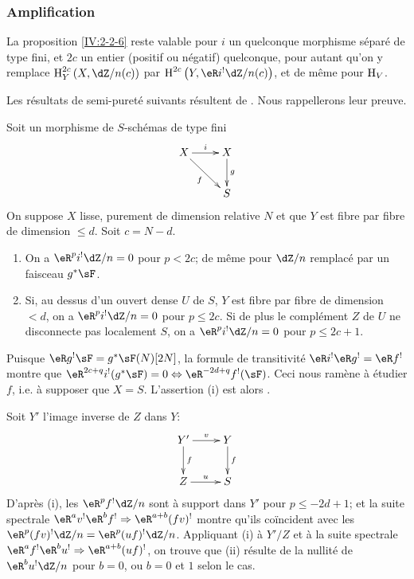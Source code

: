 \subsubsection{Amplification}\label{IV:2-2-7}

La proposition \ref{IV:2-2-6} reste valable pour $i$ un quelconque morphisme 
séparé de type fini, et $2 c$ un entier (positif ou négatif) quelconque, 
pour autant qu'on y remplace $\h_Y^{2 c}\left(X,\dZ/n(c)\right)$ par 
$\h^{2 c}\left(Y,\eR i^!\dZ/n(c)\right)$, et de même pour $\operatorname{H}_V$. 

Les résultats de semi-pureté suivants résultent de 
\cite[1.8, 1.10, 1.15]{sga2}. Nous rappellerons leur preuve. 





\begin{theorem}\label{IV:2-2-8}
Soit un morphisme de $S$-schémas de type fini 
\[\xymatrix{
  X \ar[r]^-i \ar[dr]_-f 
    & X \ar[d]^-g \\
  & S
}\]
On suppose $X$ lisse, purement de dimension relative $N$ et que $Y$ est fibre 
par fibre de dimension $\leqslant d$. Soit $c=N-d$. 
\begin{enumerate}[\indent (i)]
  \item On a $\eR^p i^!\dZ/n=0$ pour $p<2 c$; de même pour $\dZ/n$ remplacé 
    par un faisceau $g^* \sF$.
  \item Si, au dessus d'un ouvert dense $U$ de $S$, $Y$ est fibre par fibre de 
    dimension $<d$, on a $\eR^p i^!\dZ/n=0$ pour $p\leqslant 2 c$. Si de plus le 
    complément $Z$ de $U$ ne disconnecte pas localement $S$, on a 
    $\eR^pi^!\dZ/n=0$ pour $p\leqslant 2 c+1$.
\end{enumerate}
\end{theorem}

Puisque $\eR g^! \sF=g^*\sF(N)[2N]$, la formule de transitivité 
$\eR i^!\eR g^!=\eR f^!$ montre que 
$\eR^{2 c+q} i^!(g^*\sF)=0\Leftrightarrow \eR^{-2 d+q}f^!(\sF)$. Ceci nous 
ramène à étudier $f$, i.e. à supposer que $X=S$. L'assertion (i) est 
alors \cite[XVIII 3.17]{sga4}. 

Soit $Y'$ l'image inverse de $Z$ dans $Y$:
\[\xymatrix{
  Y' \ar[r]^-v \ar[d]^-f 
    & Y \ar[d]^-f \\
  Z \ar[r]^-u 
    & S
}\]
D'après (i), les $\eR^p f^! \dZ/n$ sont à support dans $Y'$ pour 
$p\leqslant -2 d+1$; et la suite spectrale 
$\eR^a v^!\eR^b f^! \Rightarrow \eR^{a+b} (f v)^!$ montre qu'ils coïncident avec 
les $\eR^p(f v)^!\dZ/n=\eR^p(u f)^!\dZ/n$. Appliquant (i) à $Y'/Z$ et à la 
suite spectrale $\eR^a f^!\eR^b u^! \Rightarrow \eR^{a+b} (u f)^!$, on trouve que 
(ii) résulte de la nullité de $\eR^b u^! \dZ/n$ pour $b=0$, ou $b=0$ et $1$ 
selon le cas. 





